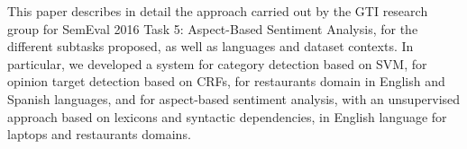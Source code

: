 This paper describes in detail the approach carried out by the GTI research group for SemEval 2016 Task 5: Aspect-Based Sentiment Analysis, for the different subtasks proposed, as well as languages and dataset contexts. In particular, we developed a system for category detection based on SVM, for opinion target detection based on CRFs, for restaurants domain in English and Spanish languages, and for aspect-based sentiment analysis, with an unsupervised approach based on lexicons and syntactic dependencies, in English language for laptops and restaurants domains.
